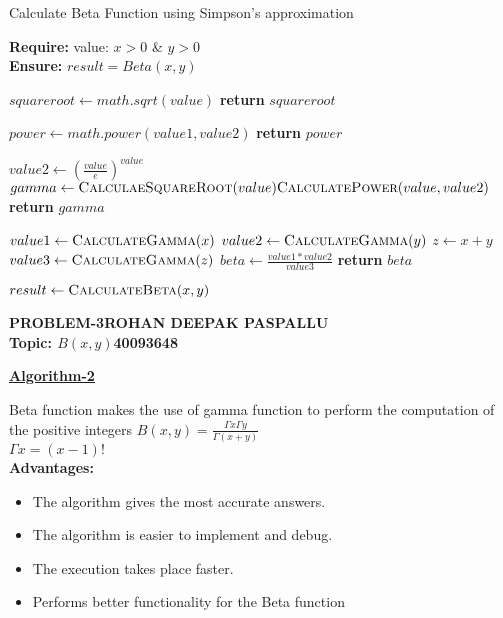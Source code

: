 \documentclass{report}
\begin{document}
\begin{algorithm}
\caption{Calculate Beta Function using Simpson's approximation}

\textbf{Require:}  value: $x > 0$ \& $y>0$  \\
\textbf{Ensure:} $result = Beta(x,y)$
\begin{algorithmic}[1]

    \State $squareroot \leftarrow math.sqrt(value)$
    \State \textbf{return} $squareroot$
    \EndProcedure
\Statex

    \State $power \leftarrow math.power(value1,value2)$
    \State \textbf{return} $power$
    \EndProcedure
\Statex

    \State $value2 \leftarrow (\frac{value}{e})^{value}$
    \State $gamma \leftarrow \Call{CalculaeSquareRoot}{value} \Call{CalculatePower}{value,value2}$
    \State \textbf{return} $gamma$
    \EndProcedure
\Statex

    \State $value1 \leftarrow \Call{CalculateGamma}{x}$
    \State $value2 \leftarrow \Call{CalculateGamma}{y}$
    \State $z \leftarrow x+y$
    \State $value3 \leftarrow \Call{CalculateGamma}{z}$
    \State $beta \leftarrow \frac{value1 * value2}{value3}$
    \State \textbf{return} $beta$
    \EndProcedure
\Statex



\State $result \leftarrow \Call{CalculateBeta}{x,y} $

\end{algorithmic}
\end{algorithm}

\newpage

\Large\textbf{PROBLEM-3}\hfill\textbf{ROHAN DEEPAK PASPALLU}\\
\textbf{Topic: $B(x,y)$}\hfill\textbf{40093648}
\begin{center}
        \Large\textbf{\underline{Algorithm-2
        }}
    \end{center}

Beta function makes the use of gamma function to perform the computation of the positive integers
\newline
$B(x,y)=\frac{\Gamma x \Gamma y}{\Gamma (x+y)}$\\
\newline
$\Gamma x = (x-1)!$\\
\textbf{Advantages:}
\begin{itemize}
    \item The algorithm gives the most accurate answers.
    \item The algorithm is easier to implement and debug.
    \item The execution takes place faster.
    \item Performs better functionality for the Beta function
\end{itemize}
\end{document}
